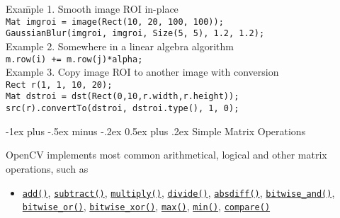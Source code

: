 \documentclass[10pt,landscape]{article}
\makeatletter
\renewcommand{\section}{\@startsection{section}{1}{0mm}%
                                {-1ex plus -.5ex minus -.2ex}%
                                {0.5ex plus .2ex}%
                                {\normalfont\large\bfseries}}
\makeatother
\begin{document}
\begin{multicols}{3}
\begin{tabular}{@{}p{\the\MyLen}%
                @{}p{\linewidth-\the\MyLen}@{}}
\end{tabular}

\begin{tabbing}
Exa\=mple 1. Smooth image ROI in-place\\
\>\texttt{Mat imgroi = image(Rect(10, 20, 100, 100));}\\
\>\texttt{GaussianBlur(imgroi, imgroi, Size(5, 5), 1.2, 1.2);}\\
Example 2. Somewhere in a linear algebra algorithm \\
\>\texttt{m.row(i) += m.row(j)*alpha;}\\
Example 3. Copy image ROI to another image with conversion\\
\>\texttt{Rect r(1, 1, 10, 20);}\\
\>\texttt{Mat dstroi = dst(Rect(0,10,r.width,r.height));}\\
\>\texttt{src(r).convertTo(dstroi, dstroi.type(), 1, 0);}\\
\end{tabbing}

\section{Simple Matrix Operations}

OpenCV implements most common arithmetical, logical and
other matrix operations, such as

\begin{itemize}
\item
\texttt{\href{http://opencv.willowgarage.com/documentation/cpp/operations_on_arrays.html\#cv-add}{add()}},  \texttt{\href{http://opencv.willowgarage.com/documentation/cpp/operations_on_arrays.html\#cv-subtract}{subtract()}},
\texttt{\href{http://opencv.willowgarage.com/documentation/cpp/operations_on_arrays.html\#cv-multiply}{multiply()}},
\texttt{\href{http://opencv.willowgarage.com/documentation/cpp/operations_on_arrays.html\#cv-divide}{divide()}},
\texttt{\href{http://opencv.willowgarage.com/documentation/cpp/operations_on_arrays.html\#cv-absdiff}{absdiff()}},
\texttt{\href{http://opencv.willowgarage.com/documentation/cpp/operations_on_arrays.html\#bitwise-and}{bitwise\_and()}},  \texttt{\href{http://opencv.willowgarage.com/documentation/cpp/operations_on_arrays.html\#bitwise-or}{bitwise\_or()}},
\texttt{\href{http://opencv.willowgarage.com/documentation/cpp/operations_on_arrays.html\#bitwise-xor}{bitwise\_xor()}},
\texttt{\href{http://opencv.willowgarage.com/documentation/cpp/operations_on_arrays.html\#cv-max}{max()}},
\texttt{\href{http://opencv.willowgarage.com/documentation/cpp/operations_on_arrays.html\#cv-min}{min()}},
\texttt{\href{http://opencv.willowgarage.com/documentation/cpp/operations_on_arrays.html\#cv-compare}{compare()}}


\end{itemize}
\end{multicols}
\end{document}
